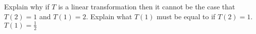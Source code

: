 {
Explain why if $T$ is a linear transformation then it cannot be the case that $T(2)=1$ and $T(1) =2$.  Explain what $T(1)$ must be equal to if $T(2) = 1$.  
}
{$T(1) = \frac{1}{2}$
}